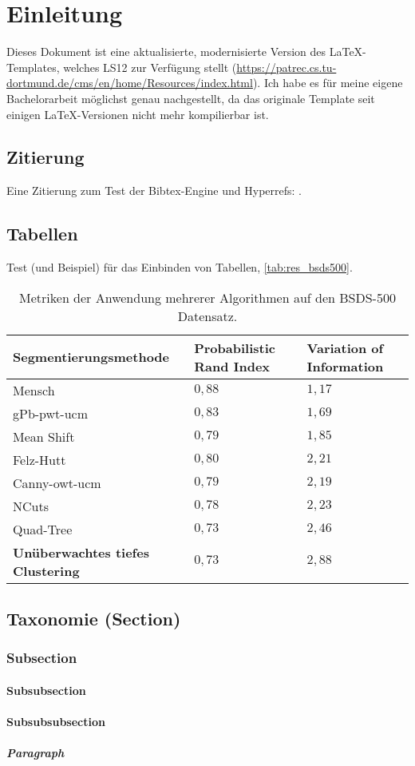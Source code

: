\chapter{Einleitung}
\label{chap:einleitung}

Dieses Dokument ist eine aktualisierte, modernisierte Version des \LaTeX-Templates, welches LS12 zur Verfügung stellt (\vgl \url{https://patrec.cs.tu-dortmund.de/cms/en/home/Resources/index.html}). Ich habe es für meine eigene Bachelorarbeit möglichst genau nachgestellt, da das originale Template seit einigen \LaTeX-Versionen nicht mehr kompilierbar ist.

\section{Zitierung}
\label{sec:einleitung/zitierung}
Eine Zitierung zum Test der Bibtex-Engine und Hyperrefs: \cite{test}.

\section{Tabellen}
\label{sec:einleitung/tabellen}
Test (und Beispiel) für das Einbinden von Tabellen, \vgl \autoref{tab:res_bsds500}.

\begin{table}[h!]
	\begin{tabularx}{\textwidth}{p{} >{\centering} p{} >{\centering\arraybackslash} p{}}
		\toprule
		\textbf{Segmentierungsmethode} & \textbf{Probabilistic Rand Index} & \textbf{Variation of Information} \\
		\midrule
		Mensch & $0,88$ & $1,17$ \\
		\midrule
		gPb-pwt-ucm & $0,83$ & $1,69$ \\
		Mean Shift & $0,79$ & $1,85$ \\
		Felz-Hutt & $0,80$ & $2,21$ \\
		Canny-owt-ucm & $0,79$ & $2,19$ \\
		NCuts & $0,78$ & $2,23$ \\
		Quad-Tree & $0,73$ & $2,46$ \\
		\textbf{Unüberwachtes tiefes Clustering} & $0,73$ & $2,88$ \\
		\bottomrule
	\end{tabularx}
	\caption{Metriken der Anwendung mehrerer Algorithmen auf den BSDS-500 Datensatz.}
	\label{tab:res_bsds500}
\end{table}

\section{Taxonomie (Section)}
\subsection{Subsection}
\subsubsection{Subsubsection}
\subsubsection{Subsubsubsection}
\paragraph{Paragraph}
